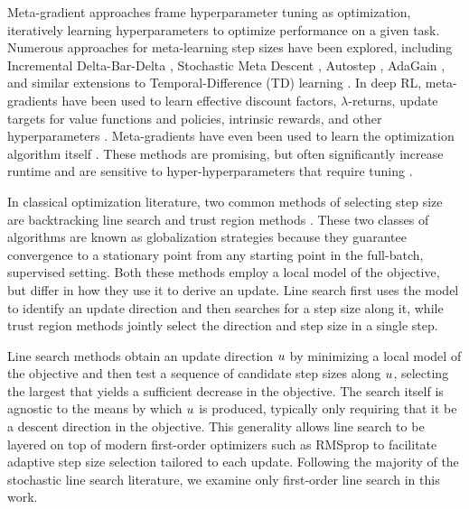Meta-gradient approaches frame
hyperparameter tuning as optimization, iteratively learning hyperparameters to optimize performance on a given task. Numerous approaches for meta-learning step sizes have been explored, including Incremental Delta-Bar-Delta \cite{sutton1992adapting}, Stochastic Meta Descent \cite{schraudolph1999local}, Autostep \cite{mahmood2012tuning}, AdaGain \cite{jacobsen2019metadescent}, and similar extensions to Temporal-Difference
(TD) learning \cite{kearney2018tidbd,young2019metatrace,thill2015temporal}.
In deep RL, meta-gradients have been used to learn effective discount factors, $\lambda$-returns, update targets for value
functions and policies, intrinsic rewards, and other hyperparameters
\cite{xu2018meta,xu2020meta,oh2020discovering,kirsch2020improving,wang2020metasac,zheng2020what,bonnet2022debiasing,zahavy2020self,zheng2018learning}.
Meta-gradients have even been used to learn the optimization algorithm itself
\cite{andrychowicz2016learning,lan2024learning}.
These methods are promising, but often significantly increase runtime and are sensitive to hyper-hyperparameters that require tuning . 

In classical optimization literature, two common methods of selecting step size are backtracking line search and trust region methods \cite{nocedal2006numerical}. These two classes of algorithms are known as globalization strategies because they guarantee convergence to a stationary point from any starting point in the full-batch, supervised setting. Both these methods employ a local model of the objective, but differ in how they use it to derive an update. Line search first uses the model to identify an update direction and then searches for a step size along it, while trust region methods jointly select the direction and step size in a single step.

Line search methods obtain an update direction $u$ by minimizing a local model of the objective and then test a sequence of candidate step sizes along $u$, selecting the largest that yields a sufficient decrease in the objective.
The search itself is agnostic to the means by which $u$ is produced, typically only requiring that it be a descent direction in the objective. This generality allows line search to be layered on top of modern first-order optimizers such as RMSprop \cite{Hinton2012lecture} to facilitate adaptive step size selection tailored to each update. Following the majority of the stochastic line search literature, we examine only first-order line search in this work.

